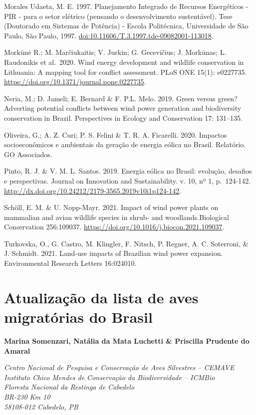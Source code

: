 \documentclass[
  oneside]{scrbook}
\begin{document}
Morales Udaeta, M. E. 1997. Planejamento Integrado de Recursos Energéticos - PIR - para o setor elétrico (pensando o desenvolvimento sustentável). Tese (Doutorado em Sistemas de Potência) - Escola Politécnica, Universidade de São Paulo, São Paulo, 1997. \url{doi:10.11606/T.3.1997.tde-09082001-113018}.

Morkūnė R.; M. Marčiukaitis; V. Jurkin; G. Gecevičius; J. Morkūnas; L. Raudonikis et al.~2020. Wind energy development and wildlife conservation in Lithuania: A mapping tool for conflict assessment. PLoS ONE 15(1): e0227735.
\url{https://doi.org/10.1371/journal.pone.0227735}.

Neria, M.; D. Jameli; E. Bernard \& F. P.L. Melo. 2019. Green versus green? Adverting potential conflicts between wind power generation and biodiversity conservation in Brazil. Perspectives in Ecology and Conservation 17: 131--135.

Oliveira, G.; A. Z. Curi; P. S. Felini \& T. R. A. Ficarelli. 2020. Impactos socioeconômicos e ambientais da geração de energia eólica no Brasil. Relatório. GO Associados.

Pinto, R. J. \& V. M. L. Santos. 2019. Energia eólica no Brasil: evolução, desafios e perspectivas. Journal on Innovation and Sustainability. v. 10, nº 1, p.~124-142. \url{http://dx.doi.org/10.24212/2179-3565.2019v10i1p124-142}.

Schöll, E. M. \& U. Nopp-Mayr. 2021. Impact of wind power plants on mammalian and avian wildlife species in
shrub- and woodlands.Biological Conservation 256:109037. \url{https://doi.org/10.1016/j.biocon.2021.109037}.

Turkovska, O., G. Castro, M. Klingler, F. Nitsch, P. Regner, A. C. Soterroni, \& J. Schmidt. 2021. Land-use impacts of Brazilian wind power expansion. Environmental Research Letters 16:024010.

\hypertarget{cap2}{%
\chapter{Atualização da lista de aves migratórias do Brasil}\label{cap2}}

\textbf{Marina Somenzari, Natália da Mata Luchetti \& Priscilla Prudente do Amaral}

\emph{Centro Nacional de Pesquisa e Conservação de Aves Silvestres -- CEMAVE}\\
\emph{Instituto Chico Mendes de Conservação da Biodiversidade -- ICMBio}\\
\emph{Floresta Nacional da Restinga de Cabedelo}\\
\emph{BR-230 Km 10}\\
\emph{58108-012 Cabedelo, PB}
\end{document}
